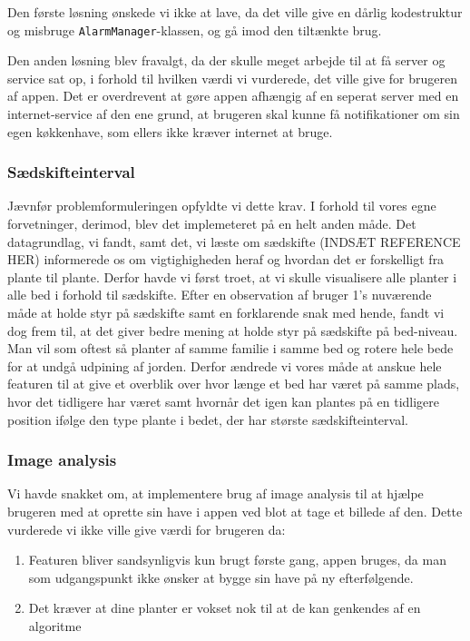 Den første løsning ønskede vi ikke at lave, da det ville give en dårlig kodestruktur og misbruge \texttt{AlarmManager}-klassen, og gå imod den tiltænkte brug.

Den anden løsning blev fravalgt, da der skulle meget arbejde til at få server og service sat op, i forhold til hvilken værdi vi vurderede, det ville give for brugeren af appen. Det er overdrevent at gøre appen afhængig af en seperat server med en internet-service af den ene grund, at brugeren skal kunne få notifikationer om sin egen køkkenhave, som ellers ikke kræver internet at bruge.

\subsubsection{Sædskifteinterval}
Jævnfør problemformuleringen opfyldte vi dette krav. I forhold til vores egne forvetninger, derimod, blev det implemeteret på en helt anden måde. Det datagrundlag, vi fandt, samt det, vi læste om sædskifte (INDSÆT REFERENCE HER) informerede os om vigtighigheden heraf og hvordan det er forskelligt fra plante til plante. Derfor havde vi først troet, at vi skulle visualisere alle planter i alle bed i forhold til sædskifte. Efter en observation af bruger 1's nuværende måde at holde styr på sædskifte samt en forklarende snak med hende, fandt vi dog frem til, at det giver bedre mening at holde styr på sædskifte på bed-niveau. Man vil som oftest så planter af samme familie i samme bed og rotere hele bede for at undgå udpining af jorden. Derfor ændrede vi vores måde at anskue hele featuren til at give et overblik over hvor længe et bed har været på samme plads, hvor det tidligere har været samt hvornår det igen kan plantes på en tidligere position ifølge den type plante i bedet, der har største sædskifteinterval.

\label{image-analysis}
\subsubsection{Image analysis}
Vi havde snakket om, at implementere brug af image analysis til at hjælpe brugeren med at oprette sin have i appen ved blot at tage et billede af den. Dette vurderede vi ikke ville give værdi for brugeren da:
\begin{enumerate}
        \item Featuren bliver sandsynligvis kun brugt første gang, appen bruges, da man som udgangspunkt ikke ønsker at bygge sin have på ny efterfølgende. 
        \item Det kræver at dine planter er vokset nok til at de kan genkendes af en algoritme
\end{enumerate}

